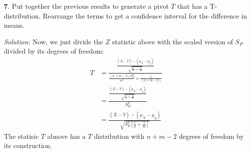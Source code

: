 \documentclass{tufte-handout}
\begin{document}
\textbf{7}. Put together the previous results to generate a pivot $T$ that has a T-distribution.
Rearrange the terms to get a confidence interval for the difference in means.

\textit{Solution:} Now, we just divide the $Z$ statistic above with the scaled version of $S_P$ 
divided by its degrees of freedom:
\begin{align*}
T &= \frac{
  \frac{(\bar{X} - \bar{Y}) - (\mu_X - \mu_y)}{\sqrt{\frac{\sigma^2}{n} + \frac{\sigma^2}{m}}}
}{
  \frac{(n + m - 2) S_P^2}{\sigma^2} \times \frac{1}{(n + m - 2)}
} \\
&= \frac{
  \frac{(\bar{X} - \bar{Y}) - (\mu_X - \mu_y)}{\sqrt{\frac{1}{n} + \frac{1}{m}}}
}{
  S_P^2
} \\
&= \frac{(\bar{X} - \bar{Y}) - (\mu_X - \mu_y)}{\sqrt{S_P^2 \left[\frac{1}{n} + \frac{1}{m}\right]}}
\end{align*}
The statisic $T$ abnove has a $T$ distribution with $n + m - 2$ degrees of freedom
by its construction.
\end{document}

